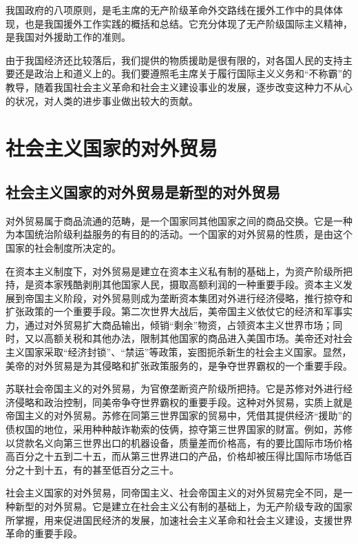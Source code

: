 \documentclass{book}
\begin{document}
我国政府的八项原则，是毛主席的无产阶级革命外交路线在援外工作中的具体体现，也是我国援外工作实践的概括和总结。它充分体现了无产阶级国际主义精神，是我国对外援助工作的准则。

由于我国经济还比较落后，我们提供的物质援助是很有限的，对各国人民的支持主要还是政治上和道义上的。我们要遵照毛主席关于履行国际主义义务和“不称霸”的教导，随着我国社会主义革命和社会主义建设事业的发展，逐步改变这种力不从心的状况，对人类的进步事业做出较大的贡献。

\section{社会主义国家的对外贸易}

\subsection{社会主义国家的对外贸易是新型的对外贸易}

对外贸易属于商品流通的范畴，是一个国家同其他国家之间的商品交换。它是一种为本国统治阶级利益服务的有目的的活动。一个国家的对外贸易的性质，是由这个国家的社会制度所决定的。

在资本主义制度下，对外贸易是建立在资本主义私有制的基础上，为资产阶级所把持，是资本家残酷剥削其他国家人民，摄取高额利润的一种重要手段。资本主义发展到帝国主义阶段，对外贸易则成为垄断资本集团对外进行经济侵略，推行掠夺和扩张政策的一个重要手段。第二次世界大战后，美帝国主义依仗它的经济和军事实力，通过对外贸易扩大商品输出，倾销“剩余”物资，占领资本主义世界市场；同时，又以高额关税和其他办法，限制其他国家的商品进入美国市场。美帝还对社会主义国家采取“经济封锁”、“禁运”等政策，妄图扼杀新生的社会主义国家。显然，美帝的对外贸易是为其侵略和扩张政策服务的，是争夺世界霸权的一个重要手段。

苏联社会帝国主义的对外贸易，为官僚垄断资产阶级所把持。它是苏修对外进行经济侵略和政治控制，同美帝争夺世界霸权的重要手段。这种对外贸易，实质上就是帝国主义的对外贸易。苏修在同第三世界国家的贸易中，凭借其提供经济“援助”的债权国的地位，采用种种敲诈勒索的伎俩，掠夺第三世界国家的财富。例如，苏修以贷款名义向第三世界出口的机器设备，质量差而价格高，有的要比国际市场价格高百分之十五到二十五，而从第三世界进口的产品，价格却被压得比国际市场低百分之十到十五，有的甚至低百分之三十。

社会主义国家的对外贸易，同帝国主义、社会帝国主义的对外贸易完全不同，是一种新型的对外贸易。它是建立在社会主义公有制的基础上，为无产阶级专政的国家所掌握，用来促进国民经济的发展，加速社会主义革命和社会主义建设，支援世界革命的重要手段。
\end{document}
